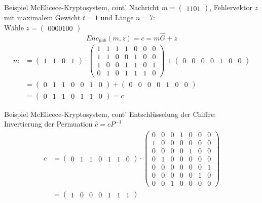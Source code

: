 \documentclass[11pt%
,aspectratio=169%
]{beamer}
\begin{document}
\begin{frame}{Beispiel McElicece-Kryptosystem, cont'}
Nachricht $m = \begin{pmatrix} 1 1 0 1 \end{pmatrix}$, Fehlervektor $z$ mit maximalem Gewicht $t = 1$ und Länge $n = 7$: \\
Wähle $z =  \begin{pmatrix} 0 0 0 0 1 0 0 \end{pmatrix}$ 
$$
    Enc_{pub}(m,z) = c = m\hat{G} + z
$$
\begin{align*}
    m &= \begin{pmatrix} 1 & 1 & 0 & 1 \end{pmatrix} \cdot \begin{pmatrix} 1 & 1 & 1 & 1 & 0 & 0 & 0 \\ 1 & 1 & 0 & 0 & 1 & 0 & 0 \\ 1 & 0 & 0 & 1 & 1 & 0 & 1 \\ 0 & 1 & 0 & 1 & 1 & 1 & 0 \end{pmatrix} + \begin{pmatrix} 0 & 0 & 0 & 0 & 1 & 0 & 0 \end{pmatrix}\\
    &= \begin{pmatrix} 0 & 1 & 1 & 0 & 0 & 1 & 0 \end{pmatrix} + \begin{pmatrix} 0 & 0 & 0 & 0 & 1 & 0 & 0 \end{pmatrix}\\
    &= \begin{pmatrix} 0 & 1 & 1 & 0 & 1 & 1 & 0 \end{pmatrix}=c    
\end{align*}
\end{frame}

\begin{frame}{Beispiel McElicece-Kryptosystem, cont'}
Entschlüsselung der Chiffre:\\
Invertierung der Permuation $\hat{c} = cP^{-1}$
\begin{align*}
       c &= \begin{pmatrix} 0 & 1 & 1 & 0 & 1 & 1 & 0 \end{pmatrix} \cdot \begin{pmatrix} 0 & 0 & 0 & 1 & 0 & 0 & 0 \\ 1 & 0 & 0 & 0 & 0 & 0 & 0 \\ 0 & 0 & 0 & 0 & 1 & 0 & 0 \\ 0 & 1 & 0 & 0 & 0 & 0 & 0 \\ 0 & 0 & 0 & 0 & 0 & 0 & 1 \\ 0 & 0 & 0 & 0 & 0 & 1 & 0 \\ 0 & 0 & 1 & 0 & 0 & 0 & 0 \end{pmatrix}\\
       &= \begin{pmatrix} 1 & 0 & 0 & 0 & 1 & 1 & 1 \end{pmatrix}
\end{align*}
\end{frame}
\end{document}
